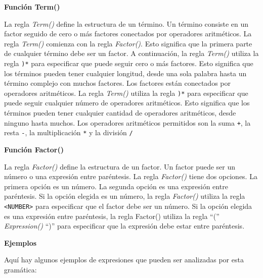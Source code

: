 \phantom{text}

\noindent \textbf{Función Term()}

\phantom{text}

\lstset{inputencoding=utf8/latin1}


\noindent La regla \textit{Term()} define la estructura de un término. Un término consiste en un factor seguido de cero o más factores conectados por operadores aritméticos. La regla \textit{Term()} comienza con la regla \textit{Factor()}. Esto significa que la primera parte de cualquier término debe ser un factor. A continuación, la regla \textit{Term()} utiliza la regla \lstinline|)*| para especificar que puede seguir cero o más factores. Esto significa que los términos pueden tener cualquier longitud, desde una sola palabra hasta un término complejo con muchos factores.
Los factores están conectados por operadores aritméticos. La regla \textit{Term()} utiliza la regla \lstinline|)*| para especificar que puede seguir cualquier número de operadores aritméticos. Esto significa que los términos pueden tener cualquier cantidad de operadores aritméticos, desde ninguno hasta muchos.
Los operadores aritméticos permitidos son la suma \lstinline|+|, la resta \lstinline|-|, la multiplicación \lstinline|*| y la división \lstinline|/|

\phantom{text}

\noindent \textbf{Función Factor()}

\phantom{text}

\lstset{inputencoding=utf8/latin1}

\noindent La regla \textit{Factor()} define la estructura de un factor. Un factor puede ser un número o una expresión entre paréntesis. La regla \textit{Factor()} tiene dos opciones. La primera opción es un número. La segunda opción es una expresión entre paréntesis. Si la opción elegida es un número, la regla \textit{Factor()} utiliza la regla \lstinline[keywordstyle=\color{black}]|<NUMBER>| para especificar que el factor debe ser un número. Si la opción elegida es una expresión entre paréntesis, la regla Factor() utiliza la regla ``('' \textit{Expression()} ``)'' para especificar que la expresión debe estar entre paréntesis.

\phantom{text}

\noindent \textbf{Ejemplos}

\phantom{text}

\noindent Aquí hay algunos ejemplos de expresiones que pueden ser analizadas por esta gramática:


